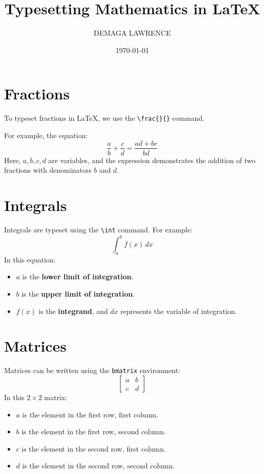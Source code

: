 \documentclass{article}
\title{Typesetting Mathematics in LaTeX}
\author{DEMAGA LAWRENCE}
\date{\today}
\begin{document}
\maketitle

\section*{Fractions}
To typeset fractions in \LaTeX, we use the \verb|\frac{}{}| command.

For example, the equation:
\[
\frac{a}{b} + \frac{c}{d} = \frac{ad + bc}{bd}
\]
Here, \(a, b, c, d\) are variables, and the expression demonstrates the addition of two fractions with denominators \(b\) and \(d\).

\section*{Integrals}
Integrals are typeset using the \verb|\int| command. For example:
\[
\int_{a}^{b} f(x)\,dx
\]
In this equation:
\begin{itemize}
    \item \(a\) is the \textbf{lower limit of integration}.
    \item \(b\) is the \textbf{upper limit of integration}.
    \item \(f(x)\) is the \textbf{integrand}, and \(dx\) represents the variable of integration.
\end{itemize}

\section*{Matrices}
Matrices can be written using the \verb|bmatrix| environment:
\[
\begin{bmatrix}
a & b \\
c & d
\end{bmatrix}
\]
In this \(2 \times 2\) matrix:
\begin{itemize}
    \item \(a\) is the element in the first row, first column.
    \item \(b\) is the element in the first row, second column.
    \item \(c\) is the element in the second row, first column.
    \item \(d\) is the element in the second row, second column.
\end{itemize}
\end{document}
